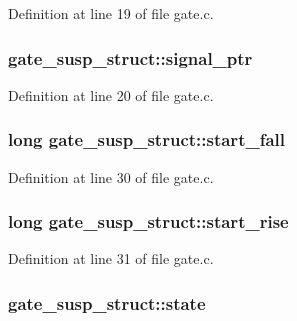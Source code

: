 Definition at line 19 of file gate.\+c.

\subsubsection[{\texorpdfstring{signal\+\_\+ptr}{signal_ptr}}]{ gate\+\_\+susp\+\_\+struct\+::signal\+\_\+ptr}\hypertarget{structgate__susp__struct_a736d226f6b4bcb7c42a68dbfb5d40706}{}\label{structgate__susp__struct_a736d226f6b4bcb7c42a68dbfb5d40706}


Definition at line 20 of file gate.\+c.

\subsubsection[{\texorpdfstring{start\+\_\+fall}{start_fall}}]{\setlength{\rightskip}{0pt plus 5cm}long gate\+\_\+susp\+\_\+struct\+::start\+\_\+fall}\hypertarget{structgate__susp__struct_a01a6f5ba88da656aba30d0845ec85939}{}\label{structgate__susp__struct_a01a6f5ba88da656aba30d0845ec85939}


Definition at line 30 of file gate.\+c.

\subsubsection[{\texorpdfstring{start\+\_\+rise}{start_rise}}]{\setlength{\rightskip}{0pt plus 5cm}long gate\+\_\+susp\+\_\+struct\+::start\+\_\+rise}\hypertarget{structgate__susp__struct_a112887a66e5a1e7f37db4049eb327ee5}{}\label{structgate__susp__struct_a112887a66e5a1e7f37db4049eb327ee5}


Definition at line 31 of file gate.\+c.

\subsubsection[{\texorpdfstring{state}{state}}]{ gate\+\_\+susp\+\_\+struct\+::state}\hypertarget{structgate__susp__struct_a3a192c80c2595f49d5d66cb7fa0e9389}{}\label{structgate__susp__struct_a3a192c80c2595f49d5d66cb7fa0e9389}


